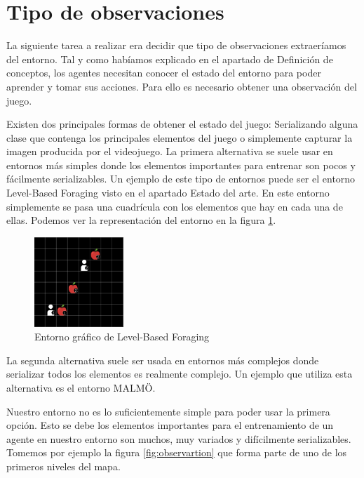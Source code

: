 \section{Tipo de observaciones}
La siguiente tarea a realizar era decidir que tipo de observaciones extraeríamos del entorno. Tal y como habíamos explicado en el apartado de Definición de conceptos, los agentes necesitan conocer el estado del entorno para poder aprender y tomar sus acciones. Para ello es necesario obtener una observación del juego. 

Existen dos principales formas de obtener el estado del juego: Serializando alguna clase que contenga los principales elementos del juego o simplemente capturar la imagen producida por el videojuego. La primera alternativa se suele usar en entornos más simples donde los elementos importantes para entrenar son pocos y fácilmente serializables. Un ejemplo de este tipo de entornos puede ser el entorno Level-Based Foraging visto en el apartado Estado del arte. En este entorno simplemente se pasa una cuadrícula con los elementos que hay en cada una de ellas. Podemos ver la representación del entorno en la figura \ref {fig:foraging-2}.

\begin{figure}[h]
    \centering
    \includegraphics[width=0.3\textwidth]{img/level-base.png}
    \caption{Entorno gráfico de Level-Based Foraging \cite {env-list}}
    \label{fig:foraging-2}
\end{figure}

La segunda alternativa suele ser usada en entornos más complejos donde serializar todos los elementos es realmente complejo. Un ejemplo que utiliza esta alternativa es el entorno MALMÖ.

Nuestro entorno no es lo suficientemente simple para poder usar la primera opción. Esto se debe los elementos importantes para el entrenamiento de un agente en nuestro entorno son muchos, muy variados y difícilmente serializables. Tomemos por ejemplo la figura \ref {fig:observartion} que forma parte de uno de los primeros niveles del mapa. 

